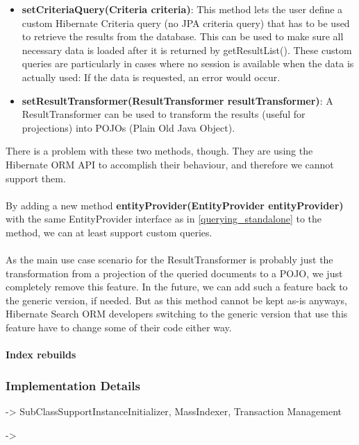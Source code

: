 \begin{itemize}
	\item \textbf{setCriteriaQuery(Criteria criteria)}:
		This method lets the user define a custom Hibernate Criteria query (no JPA criteria query) that has to be used to retrieve the results from the database. This can be used to make sure all necessary data is loaded after it is returned by getResultList(). These custom queries are  particularly in cases where no session is available when the data is actually used: If the data is requested, an error would occur.
	\item \textbf{setResultTransformer(ResultTransformer resultTransformer)}:
		A ResultTransformer can be used to transform the results (useful for projections) into POJOs (Plain Old Java Object).
\end{itemize}
\noindent
There is a problem with these two methods, though. They are using the Hibernate ORM API to accomplish their behaviour, and therefore we cannot support them.
\\\\
By adding a new method \textbf{entityProvider(EntityProvider entityProvider)} with the same EntityProvider interface as in \ref{querying_standalone} to the method, we can at least support custom queries. 
\\\\
As the main use case scenario for the ResultTransformer is probably just the transformation from a projection of the queried documents to a POJO, we just completely remove this feature. In the future, we can add such a feature back to the generic version, if needed. But as this method cannot be kept as-is anyways, Hibernate Search ORM developers switching to the generic version that use this feature have to change some of their code either way.

\paragraph{Index rebuilds}

\subsubsection{Implementation Details}

-> SubClassSupportInstanceInitializer, MassIndexer, Transaction Management





-> 


\pagebreak